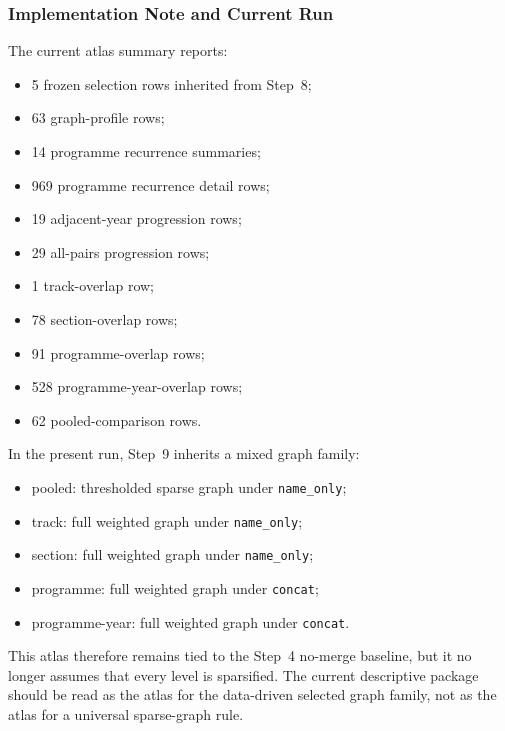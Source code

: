 \subsubsection{Implementation Note and Current Run}
\label{sec:step9_implementation_note}

The current atlas summary reports:
\begin{itemize}
    \item 5 frozen selection rows inherited from Step~8;
    \item 63 graph-profile rows;
    \item 14 programme recurrence summaries;
    \item 969 programme recurrence detail rows;
    \item 19 adjacent-year progression rows;
    \item 29 all-pairs progression rows;
    \item 1 track-overlap row;
    \item 78 section-overlap rows;
    \item 91 programme-overlap rows;
    \item 528 programme-year-overlap rows;
    \item 62 pooled-comparison rows.
\end{itemize}

In the present run, Step~9 inherits a mixed graph family:
\begin{itemize}
    \item pooled: thresholded sparse graph under \texttt{name\_only};
    \item track: full weighted graph under \texttt{name\_only};
    \item section: full weighted graph under \texttt{name\_only};
    \item programme: full weighted graph under \texttt{concat};
    \item programme-year: full weighted graph under \texttt{concat}.
\end{itemize}

This atlas therefore remains tied to the Step~4 no-merge baseline, but it no longer assumes that every level is sparsified. The current descriptive package should be read as the atlas for the data-driven selected graph family, not as the atlas for a universal sparse-graph rule.
